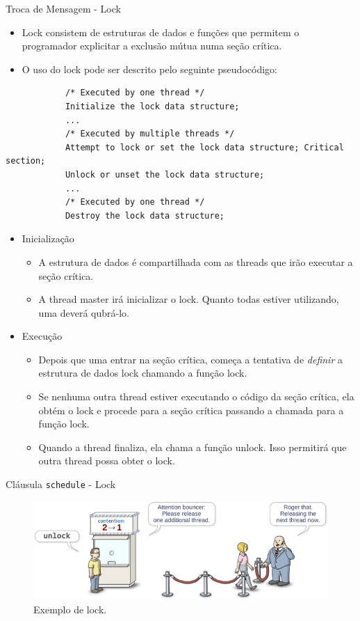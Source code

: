 	\begin{frame}[fragile]{Troca de Mensagem -  Lock}
		\begin{itemize}
			\item Lock consistem de estruturas de dados e funções que permitem o programador explicitar a exclusão mútua numa seção crítica.
			\item O uso do lock pode ser descrito pelo seguinte pseudocódigo:
		\end{itemize}
		\begin{verbatim}
			/* Executed by one thread */
			Initialize the lock data structure;
			...
			/* Executed by multiple threads */
			Attempt to lock or set the lock data structure; Critical section;
			Unlock or unset the lock data structure;
			...
			/* Executed by one thread */
			Destroy the lock data structure;
		\end{verbatim}
		\begin{itemize}
			\item Inicialização
			\begin{itemize}
				\item A estrutura de dados é compartilhada com as threads que irão executar a seção crítica.
				\item A thread master irá inicializar o lock. Quanto todas estiver utilizando, uma deverá qubrá-lo.
			\end{itemize}
			\item Execução
			\begin{itemize}
				\item Depois que uma entrar na seção crítica, começa a tentativa de \textit{definir} a estrutura de dados lock chamando a função lock.
				\item Se nenhuma outra thread estiver executando o código da seção crítica, ela obtém o lock e procede para a seção crítica passando a chamada para a função lock.
				\item Quando a thread finaliza, ela chama a função unlock. Isso permitirá que outra thread possa obter o lock.
			\end{itemize}
		\end{itemize}
\end{frame}

	\begin{frame}{Cláusula {\tt schedule} - Lock}
		\begin{figure}[p]
			\centering
			\includegraphics[width=1\textwidth]{img/pacheco/mutex.png}
			\caption{Exemplo de lock.}
		\end{figure}
	\end{frame}

